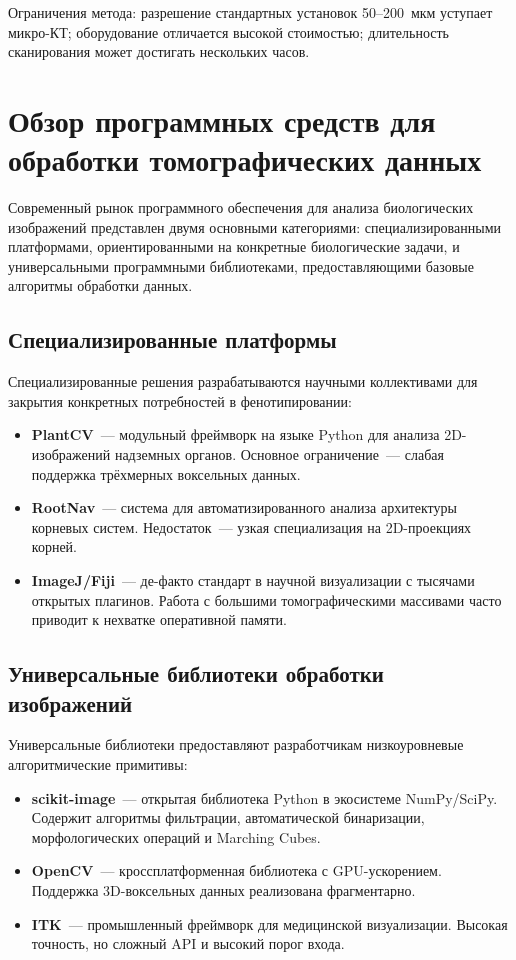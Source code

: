 \documentclass[14pt,a4paper]{extreport}
\begin{document}
Ограничения метода: разрешение стандартных установок 50--200~мкм уступает микро-КТ; оборудование отличается высокой стоимостью; длительность сканирования может достигать нескольких часов.

\section{Обзор программных средств для обработки томографических данных}

Современный рынок программного обеспечения для анализа биологических изображений представлен двумя основными категориями: специализированными платформами, ориентированными на конкретные биологические задачи, и универсальными программными библиотеками, предоставляющими базовые алгоритмы обработки данных.

\subsection{Специализированные платформы}

Специализированные решения разрабатываются научными коллективами для закрытия конкретных потребностей в фенотипировании:
\begin{itemize}
  \item \textbf{PlantCV}~--- модульный фреймворк на языке Python для анализа 2D-изображений надземных органов. Основное ограничение~--- слабая поддержка трёхмерных воксельных данных.
  \item \textbf{RootNav}~--- система для автоматизированного анализа архитектуры корневых систем. Недостаток~--- узкая специализация на 2D-проекциях корней.
  \item \textbf{ImageJ/Fiji}~--- де-факто стандарт в научной визуализации с тысячами открытых плагинов. Работа с большими томографическими массивами часто приводит к нехватке оперативной памяти.
\end{itemize}

\subsection{Универсальные библиотеки обработки изображений}

Универсальные библиотеки предоставляют разработчикам низкоуровневые алгоритмические примитивы:
\begin{itemize}
  \item \textbf{scikit-image}~--- открытая библиотека Python в экосистеме NumPy/SciPy. Содержит алгоритмы фильтрации, автоматической бинаризации, морфологических операций и Marching Cubes.
  \item \textbf{OpenCV}~--- кроссплатформенная библиотека с GPU-ускорением. Поддержка 3D-воксельных данных реализована фрагментарно.
  \item \textbf{ITK}~--- промышленный фреймворк для медицинской визуализации. Высокая точность, но сложный API и высокий порог входа.
\end{itemize}
\end{document}
